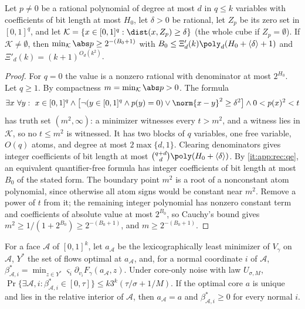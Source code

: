 \begin{lemma}\label{lem:int:margin}
Let $p\ne0$ be a rational polynomial of degree at most $d$ in $q\le k$ variables with
coefficients of bit length at most $H_0$, let $\delta>0$ be rational, let $Z_p$ be its
zero set in $[0,1]^q$, and let $\mathcal K=\{x\in[0,1]^q:\dist(x,Z_p)\ge\delta\}$ (the
whole cube if $Z_p=\emptyset$). If $\mathcal K\ne\emptyset$, then
$\min_{\mathcal K}\abs p\ge2^{-(B_0+1)}$ with $B_0\le\Xi'_d(k)\poly_d(H_0+\langle\delta\rangle+1)$
and $\Xi'_d(k)=(k+1)^{O_d(k^2)}$.
\end{lemma}

\begin{proof}
For $q=0$ the value is a nonzero rational with denominator at most $2^{H_0}$. Let
$q\ge1$. By compactness $m=\min_{\mathcal K}\abs p>0$. The formula
\[
 \exists x\ \forall y:\ x\in[0,1]^q\wedge\bigl[\neg(y\in[0,1]^q\wedge p(y)=0)\vee
 \norm{x-y}^2\ge\delta^2\bigr]\wedge0<p(x)^2<t
\]
has truth set $(m^2,\infty)$: a minimizer witnesses every $t>m^2$, and a witness lies
in $\mathcal K$, so no $t\le m^2$ is witnessed. It has two blocks of $q$ variables, one
free variable, $O(q)$ atoms, and degree at most $2\max\{d,1\}$. Clearing denominators
gives integer coefficients of bit length at most $\binom{q+d}d\poly(H_0+\langle\delta\rangle)$.
By \ref{it:app:rec:qe}, an equivalent quantifier-free formula has integer coefficients
of bit length at most $B_0$ of the stated form. The boundary point $m^2$ is a root of a
nonconstant atom polynomial, since otherwise all atom signs would be constant near
$m^2$. Remove a power of $t$ from it; the remaining integer polynomial has nonzero
constant term and coefficients of absolute value at most $2^{B_0}$, so Cauchy's bound
gives $m^2\ge1/(1+2^{B_0})\ge2^{-(B_0+1)}$, and $m\ge2^{-(B_0+1)}$.
\end{proof}

\begin{lemma}\label{lem:int:normal}
For a face $\mathcal A$ of $[0,1]^k$, let $a_{\mathcal A}$ be the lexicographically
least minimizer of $V_\gamma$ on $\mathcal A$, $Y^*$ the set of flows optimal at
$a_{\mathcal A}$, and, for a normal coordinate $i$ of $\mathcal A$,
$\beta^*_{\mathcal A,i}=\min_{z\in Y^*}\varsigma_i\partial_{v_i}F_\gamma(a_{\mathcal A},z)$.
Under core-only noise with law $U_{\sigma,M}$,
$\Pr\{\exists\mathcal A,i:\beta^*_{\mathcal A,i}\in[0,\tau]\}\le k3^k(\tau/\sigma+1/M)$.
If the optimal core $a$ is unique and lies in the relative interior of $\mathcal A$,
then $a_{\mathcal A}=a$ and $\beta^*_{\mathcal A,i}\ge0$ for every normal $i$.
\end{lemma}

